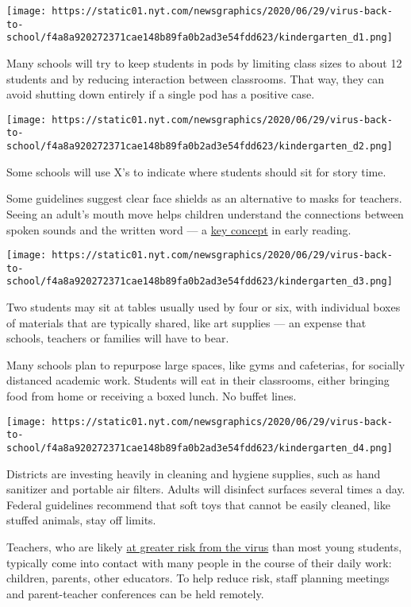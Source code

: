 \texttt{[image: https://static01.nyt.com/newsgraphics/2020/06/29/virus-back-to-school/f4a8a920272371cae148b89fa0b2ad3e54fdd623/kindergarten\_d1.png]}

Many schools will try to keep students in pods by limiting class sizes
to about 12 students and by reducing interaction between classrooms.
That way, they can avoid shutting down entirely if a single pod has a
positive case.

\texttt{[image: https://static01.nyt.com/newsgraphics/2020/06/29/virus-back-to-school/f4a8a920272371cae148b89fa0b2ad3e54fdd623/kindergarten\_d2.png]}

Some schools will use X's to indicate where students should sit for
story time.

Some guidelines suggest clear face shields as an alternative to masks
for teachers. Seeing an adult's mouth move helps children understand the
connections between spoken sounds and the written word --- a
\href{https://www.nytimes.com/2020/02/15/us/reading-phonics.html}{key
concept} in early reading.

\texttt{[image: https://static01.nyt.com/newsgraphics/2020/06/29/virus-back-to-school/f4a8a920272371cae148b89fa0b2ad3e54fdd623/kindergarten\_d3.png]}

Two students may sit at tables usually used by four or six, with
individual boxes of materials that are typically shared, like art
supplies --- an expense that schools, teachers or families will have to
bear.

Many schools plan to repurpose large spaces, like gyms and cafeterias,
for socially distanced academic work. Students will eat in their
classrooms, either bringing food from home or receiving a boxed lunch.
No buffet lines.

\texttt{[image: https://static01.nyt.com/newsgraphics/2020/06/29/virus-back-to-school/f4a8a920272371cae148b89fa0b2ad3e54fdd623/kindergarten\_d4.png]}

Districts are investing heavily in cleaning and hygiene supplies, such
as hand sanitizer and portable air filters. Adults will disinfect
surfaces several times a day. Federal guidelines recommend that soft
toys that cannot be easily cleaned, like stuffed animals, stay off
limits.

Teachers, who are likely
\href{https://www.nytimes.com/2020/07/15/health/coronavirus-schools-reopening.html}{at
greater risk from the virus} than most young students, typically come
into contact with many people in the course of their daily work:
children, parents, other educators. To help reduce risk, staff planning
meetings and parent-teacher conferences can be held remotely.


